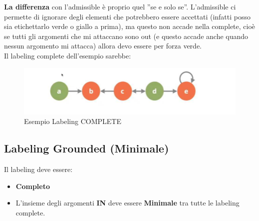     \noindent \textbf{La differenza} con l'admissible è proprio quel ”se e solo
    se”. L'admissible ci permette di ignorare degli elementi che potrebbero
    essere accettati (infatti posso sia etichettarlo verde o giallo a prima), ma
    questo non accade nella complete, cioè se tutti gli argomenti che mi
    attaccano sono out (e questo accade anche quando nessun argomento mi
    attacca) allora devo essere per forza verde. \\
    Il labeling complete dell'esempio sarebbe:
    \begin{figure}[htp]
        \centering
        \includegraphics[width=12cm, keepaspectratio]{img/Cap7/LC2.png}
        \caption{Esempio Labeling COMPLETE}
    \end{figure}

    \subsection{Labeling Grounded (Minimale)}
    Il labeling deve essere:
    \begin{itemize}
        \item \textbf{Completo}
        \item L'insieme degli argomenti \textbf{IN} deve essere
              \textbf{Minimale} tra tutte le labeling complete.
    \end{itemize}
